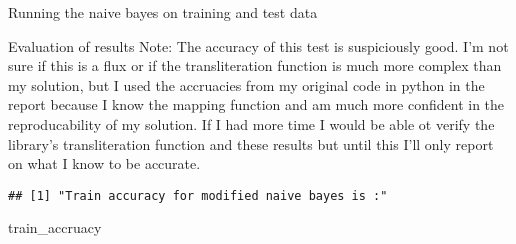 \documentclass[]{article}
\newenvironment{Shaded}{\begin{snugshade}}{\end{snugshade}}
\newcommand{\DecValTok}[1]{\textcolor[rgb]{0.00,0.00,0.81}{#1}}
\newcommand{\KeywordTok}[1]{\textcolor[rgb]{0.13,0.29,0.53}{\textbf{#1}}}
\newcommand{\NormalTok}[1]{#1}
\newcommand{\OperatorTok}[1]{\textcolor[rgb]{0.81,0.36,0.00}{\textbf{#1}}}
\newcommand{\StringTok}[1]{\textcolor[rgb]{0.31,0.60,0.02}{#1}}
\begin{document}
Running the naive bayes on training and test data

\begin{Shaded}
\end{Shaded}

Evaluation of results Note: The accuracy of this test is suspiciously
good. I'm not sure if this is a flux or if the transliteration function
is much more complex than my solution, but I used the accruacies from my
original code in python in the report because I know the mapping
function and am much more confident in the reproducability of my
solution. If I had more time I would be able ot verify the library's
transliteration function and these results but until this I'll only
report on what I know to be accurate.

\begin{Shaded}
\end{Shaded}

\begin{verbatim}
## [1] "Train accuracy for modified naive bayes is :"
\end{verbatim}

\begin{Shaded}
\begin{Highlighting}[]
\NormalTok{train_accruacy}
\end{Highlighting}
\end{Shaded}
\end{document}
